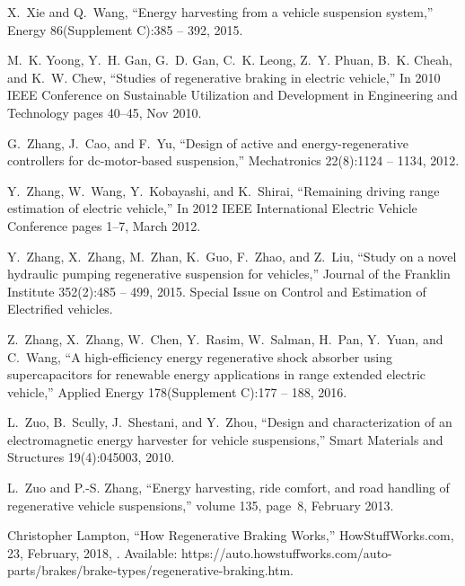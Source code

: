 X.~Xie and Q.~Wang,
\newblock ``Energy harvesting from a vehicle suspension system,''
\newblock Energy 86(Supplement C):385 -- 392, 2015.

M.~K. Yoong, Y.~H. Gan, G.~D. Gan, C.~K. Leong, Z.~Y. Phuan, B.~K. Cheah, and
  K.~W. Chew,
\newblock ``Studies of regenerative braking in electric vehicle,''
\newblock In 2010 IEEE Conference on Sustainable Utilization and
  Development in Engineering and Technology pages 40--45, Nov 2010.

G.~Zhang, J.~Cao, and F.~Yu,
\newblock ``Design of active and energy-regenerative controllers for
  dc-motor-based suspension,''
\newblock Mechatronics 22(8):1124 -- 1134, 2012.

Y.~Zhang, W.~Wang, Y.~Kobayashi, and K.~Shirai,
\newblock ``Remaining driving range estimation of electric vehicle,''
\newblock In 2012 IEEE International Electric Vehicle Conference pages
  1--7, March 2012.

Y.~Zhang, X.~Zhang, M.~Zhan, K.~Guo, F.~Zhao, and Z.~Liu,
\newblock ``Study on a novel hydraulic pumping regenerative suspension for
  vehicles,''
\newblock Journal of the Franklin Institute 352(2):485 -- 499, 2015.
\newblock Special Issue on Control and Estimation of Electrified vehicles.

Z.~Zhang, X.~Zhang, W.~Chen, Y.~Rasim, W.~Salman, H.~Pan, Y.~Yuan, and C.~Wang,
\newblock ``A high-efficiency energy regenerative shock absorber using
  supercapacitors for renewable energy applications in range extended electric
  vehicle,''
\newblock Applied Energy 178(Supplement C):177 -- 188, 2016.

L.~Zuo, B.~Scully, J.~Shestani, and Y.~Zhou,
\newblock ``Design and characterization of an electromagnetic energy harvester
  for vehicle suspensions,''
\newblock Smart Materials and Structures 19(4):045003, 2010.

L.~Zuo and P.-S. Zhang,
\newblock ``Energy harvesting, ride comfort, and road handling of regenerative
  vehicle suspensions,''
\newblock volume 135, page~8, February 2013.

Christopher Lampton,
\newblock ``How Regenerative Braking Works,''
\newblock HowStuffWorks.com, 23, February, 2018, 
\newblock [Online]. Available: https://auto.howstuffworks.com/auto-parts/brakes/brake-types/regenerative-braking.htm.


